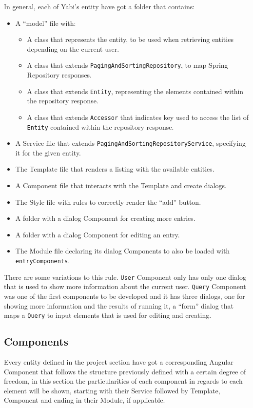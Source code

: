 In general, each of \gls{Yabi}'s entity have got a folder that contains:
\begin{itemize}
\item A ``model'' file with:
  \begin{itemize}
  \item A class that represents the entity, to be used when retrieving entities depending on the current user.
  \item A class that extends \texttt{PagingAndSortingRepository}, to map Spring Repository responses.
  \item A class that extends \texttt{Entity}, representing the elements contained within the repository response.
  \item A class that extends \texttt{Accessor} that indicates key used to access the list of \texttt{Entity} contained within the repository response.
  \end{itemize}
\item A Service file that extends \texttt{PagingAndSortingRepositoryService}, specifying it for the given entity.
\item The Template file that renders a listing with the available entities.
\item A Component file that interacts with the Template and create dialogs.
\item The Style file with rules to correctly render the ``add'' button.
\item A folder with a dialog Component for creating more entries.
\item A folder with a dialog Component for editing an entry.
\item The Module file declaring its dialog Components to also be loaded with \texttt{entryComponents}.
\end{itemize}

There are some variations to this rule. \texttt{User} Component only has only one dialog that is used to show more information about the current user. \texttt{Query} Component was one of the first components to be developed and it has three dialogs, one for showing more information and the results of running it, a ``form'' dialog that maps a \texttt{Query} to input elements that is used for editing and creating.

\subsection{Components}\label{components}
Every entity defined in the project section have got a corresponding Angular Component that follows the structure previously defined with a certain degree of freedom, in this section the particularities of each component in regards to each element will be shown, starting with their Service followed by Template, Component and ending in their Module, if applicable.

